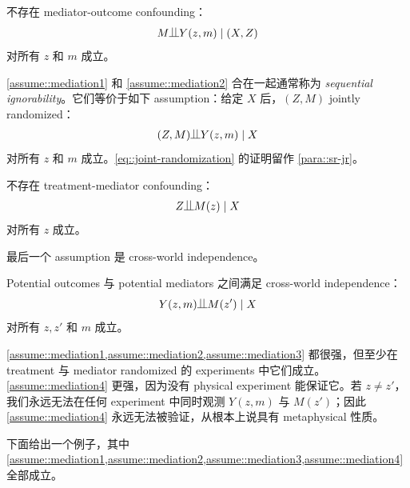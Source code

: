 \begin{assumption}
\label{assume::mediation2}
不存在 mediator-outcome confounding：
$$
M \ind Y(z,m) \mid (X, Z)
$$ 
对所有 $z$ 和 $m$ 成立。
\end{assumption}

\cref{assume::mediation1} 和 \cref{assume::mediation2} 合在一起通常称为 {\it sequential ignorability}。它们等价于如下 assumption：给定 $X$ 后，$(Z,M)$ jointly randomized：
\begin{eqnarray}\label{eq::joint-randomization}
(Z, M) \ind Y(z,m)\mid X
\end{eqnarray} 
对所有 $z$ 和 $m$ 成立。\cref{eq::joint-randomization} 的证明留作 \cref{para::sr-jr}。



\begin{assumption}
\label{assume::mediation3}
不存在 treatment-mediator confounding：
$$
Z \ind M(z) \mid X
$$ 
对所有 $z$ 成立。
\end{assumption}

最后一个 assumption 是 cross-world independence。

\begin{assumption}
\label{assume::mediation4}
Potential outcomes 与 potential mediators 之间满足 cross-world independence：
$$
Y(z,m) \ind M(z') \mid X
$$ 
对所有 $z,z'$ 和 $m$ 成立。
\end{assumption}


\cref{assume::mediation1,assume::mediation2,assume::mediation3} 都很强，但至少在 treatment 与 mediator randomized 的 experiments 中它们成立。\cref{assume::mediation4} 更强，因为没有 physical experiment 能保证它。若 $z\neq z'$，我们永远无法在任何 experiment 中同时观测 $Y(z,m)$ 与 $M(z')$；因此 \cref{assume::mediation4} 永远无法被验证，从根本上说具有 metaphysical 性质。

下面给出一个例子，其中 \cref{assume::mediation1,assume::mediation2,assume::mediation3,assume::mediation4} 全部成立。

